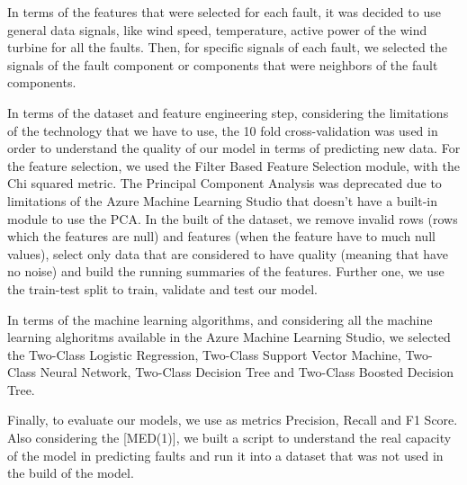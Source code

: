 
In terms of the features that were selected for each fault, it was decided to use general data signals, like wind speed, temperature, active power of the wind turbine for all the faults. Then, for specific signals of each fault, we selected the signals of the fault component or components that were neighbors of the fault components.

In terms of the dataset and feature engineering step, considering the limitations of the technology that we have to use, the 10 fold cross-validation was used in order to understand the quality of our model in terms of predicting new data. For the feature selection, we used the Filter Based Feature Selection module, with the Chi squared metric. The Principal Component Analysis was deprecated due to limitations of the Azure Machine Learning Studio that doesn't have a built-in module to use the PCA. In the built of the dataset, we remove invalid rows (rows which the features are null) and features (when the feature have to much null values), select only data that are considered to have quality (meaning that have no noise) and build the running summaries of the features. Further one, we use the train-test split to train, validate and test our model.

In terms of the machine learning algorithms, and considering all the machine learning alghoritms available in the Azure Machine Learning Studio, we selected the Two-Class Logistic Regression, Two-Class Support Vector Machine, Two-Class Neural Network, Two-Class Decision Tree and Two-Class Boosted Decision Tree.

Finally, to evaluate our models, we use as metrics Precision, Recall and F1 Score. Also considering the [MED(1)], we built a script to understand the real capacity of the model in predicting faults and run it into a dataset that was not used in the build of the model.
